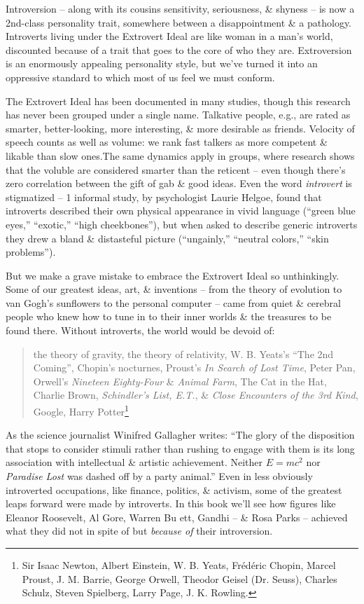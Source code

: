 \documentclass{article}
\numberwithin{equation}{section}
\begin{document}
Introversion -- along with its cousins sensitivity, seriousness, \& shyness -- is now a 2nd-class personality trait, somewhere between a disappointment \& a pathology. Introverts living under the Extrovert Ideal are like woman in a man's world, discounted because of a trait that goes to the core of who they are. Extroversion is an enormously appealing personality style, but we've turned it into an oppressive standard to which most of us feel we must conform.

The Extrovert Ideal has been documented in many studies, though this research has never been grouped under a single name. Talkative people, e.g., are rated as smarter, better-looking, more interesting, \& more desirable as friends. Velocity of speech counts as well as volume: we rank fast talkers as more competent \& likable than slow ones.The same dynamics apply in groups, where research shows that the voluble are considered smarter than the reticent -- even though there's zero correlation between the gift of gab \& good ideas. Even the word \textit{introvert} is stigmatized -- 1 informal study, by psychologist Laurie Helgoe, found that introverts described their own physical appearance in vivid language (``green blue eyes,'' ``exotic,'' ``high cheekbones''), but when asked to describe generic introverts they drew a bland \& distasteful picture (``ungainly,'' ``neutral colors,'' ``skin problems'').

But we make a grave mistake to embrace the Extrovert Ideal so unthinkingly. Some of our greatest ideas, art, \& inventions -- from the theory of evolution to van Gogh's sunflowers to the personal computer -- came from quiet \& cerebral people who knew how to tune in to their inner worlds \& the treasures to be found there. Without introverts, the world would be devoid of:
\begin{quotation}
	the theory of gravity, the theory of relativity, W. B. Yeats's ``The 2nd Coming'', Chopin's nocturnes, Proust's \textit{In Search of Lost Time}, Peter Pan, Orwell's \textit{Nineteen Eighty-Four} \& \textit{Animal Farm}, The Cat in the Hat, Charlie Brown, \textit{Schindler's List, E.T.}, \& \textit{Close Encounters of the 3rd Kind}, Google, Harry Potter\footnote{Sir Isaac Newton, Albert Einstein, W. B. Yeats, Fr\'ed\'eric Chopin, Marcel Proust, J. M. Barrie, George Orwell, Theodor Geisel (Dr. Seuss), Charles Schulz, Steven Spielberg, Larry Page, J. K. Rowling.}
\end{quotation}
As the science journalist Winifred Gallagher writes: ``The glory of the disposition that stops to consider stimuli rather than rushing to engage with them is its long association with intellectual \& artistic achievement. Neither $E = mc^2$ nor \textit{Paradise Lost} was dashed off by a party animal.'' Even in less obviously introverted occupations, like finance, politics, \& activism, some of the greatest leaps forward were made by introverts. In this book we'll see how figures like Eleanor Roosevelt, Al Gore, Warren Bu ett, Gandhi -- \& Rosa Parks -- achieved what they did not in spite of but \textit{because of} their introversion.
\end{document}
